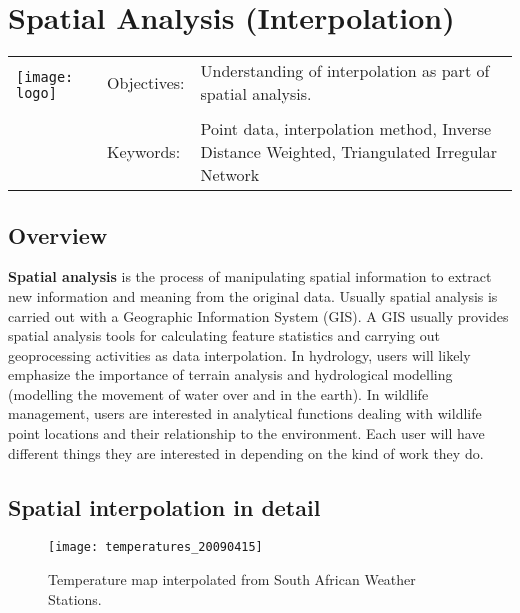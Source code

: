 

\section{Spatial Analysis (Interpolation)}\label{sec:interpolation}
\begin{tabular}{p{3.5cm}p{6cm}p{6cm}}
\multirow{2}{*}{\texttt{[image: logo]}} & Objectives: &
Understanding of interpolation as part of spatial analysis. \\
& & \\
& Keywords: & 
Point data, interpolation method, Inverse Distance Weighted, Triangulated
Irregular Network  \\
\hline
\end{tabular}

\subsection{Overview}

\textbf{Spatial analysis} is the process of manipulating spatial information
to extract
new information and meaning from the original data. Usually spatial analysis
is carried out with a Geographic Information System (GIS). A GIS usually
provides spatial analysis tools for calculating feature statistics and
carrying out  geoprocessing activities as data interpolation. 
In hydrology, users will likely emphasize the importance of terrain analysis
and hydrological modelling (modelling the movement of water over and in the
earth). In wildlife management, users are interested in analytical functions
dealing with wildlife point locations and their relationship to the
environment. Each user will have different things they are interested in
depending on the kind of work they do.

\subsection{Spatial interpolation in detail}

\begin{figure}[ht]
   \begin{center}
   \caption{Temperature map interpolated from South African Weather Stations.}
\label{fig:temperature}\smallskip
   \texttt{[image: temperatures\_20090415]}
\end{center}
\end{figure}

